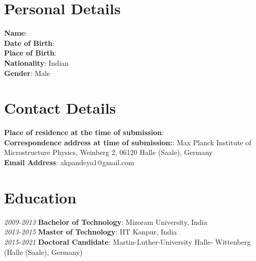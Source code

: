 
\section*{Personal Details}
\textbf{Name}: \thesisAuthor \\
\textbf{Date of Birth}: \thesisAuthorDOB \\
\textbf{Place of Birth}: \thesisAuthorCity \\
\textbf{Nationality}: Indian \\
\textbf{Gender}: Male \\

\section*{Contact Details}

\textbf{Place of residence at the time of submission}: \thesisCity \\
\textbf{Correspondence address at time of submission:}: Max Planck Institute 
    of Microstructure Physics, Weinberg 2, 06120 Halle (Saale), Germany \\
\textbf{Email Address}: akpandeya1@gmail.com \\

\section*{Education}

\textit{2009-2013} \textbf{Bachelor of Technology}: Mizoram University, India \\
\textit{2013-2015} \textbf{Master of Technology}: IIT Kanpur, India \\
\textit{2015-2021} \textbf{Doctoral Candidate}: Martin-Luther-University Halle-
    Wittenberg (Halle (Saale), Germany) \\